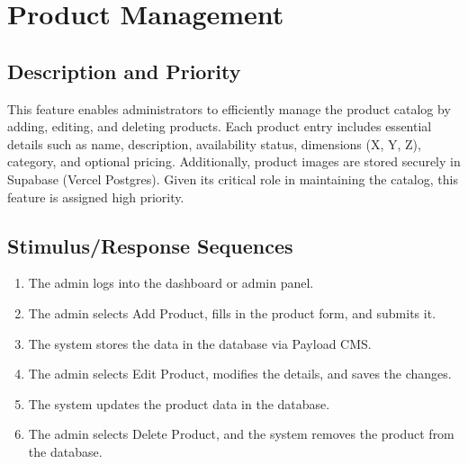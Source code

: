 \documentclass[oneside,a4paper,12pt,explicit]{book}
\begin{document}




\section{Product Management}

\subsection{Description and Priority}
This feature enables administrators to efficiently manage the product catalog by adding, editing, and deleting products. Each product entry includes essential details such as name, description, availability status, dimensions (X, Y, Z), category, and optional pricing. Additionally, product images are stored securely in Supabase (Vercel Postgres). Given its critical role in maintaining the catalog, this feature is assigned high priority.

\subsection{Stimulus/Response Sequences}
\begin{enumerate}
    \item The admin logs into the dashboard or admin panel.
    \item The admin selects Add Product, fills in the product form, and submits it.
    \item The system stores the data in the database via Payload CMS.
    \item The admin selects Edit Product, modifies the details, and saves the changes.
    \item The system updates the product data in the database.
    \item The admin selects Delete Product, and the system removes the product from the database.
\end{enumerate}
\end{document}
